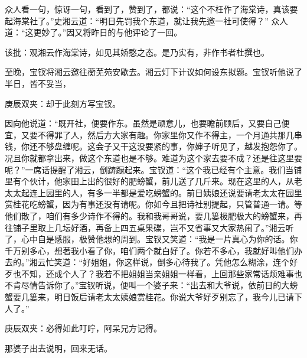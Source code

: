 \begin{parag}
    众人看一句，惊讶一句，看到了，赞到了，都说：“这个不枉作了海棠诗，真该要起海棠社了。”史湘云道：“明日先罚我个东道，就让我先邀一社可使得？” 众人道：“这更妙了。”因又将昨日的与他评论了一回。\begin{note}该批：观湘云作海棠诗，如见其娇憨之态。是乃实有，非作书者杜撰也。\end{note}
\end{parag}


\begin{parag}
    至晚，宝钗将湘云邀往蘅芜苑安歇去。湘云灯下计议如何设东拟题。宝钗听他说了半日，皆不妥当，\begin{note}庚辰双夹：却于此刻方写宝钗。\end{note}因向他说道：“既开社，便要作东。虽然是顽意儿，也要瞻前顾后，又要自己便宜，又要不得罪了人，然后方大家有趣。你家里你又作不得主，一个月通共那几串钱，你还不够盘缠呢。这会子又干这没要紧的事，你婶子听见了，越发抱怨你了。况且你就都拿出来，做这个东道也是不够。难道为这个家去要不成？还是往这里要呢？”一席话提醒了湘云，倒踌蹰起来。宝钗道：“这个我已经有个主意。我们当铺里有个伙计，他家田上出的很好的肥螃蟹，前儿送了几斤来。现在这里的人，从老太太起连上园里的人，有多一半都是爱吃螃蟹的。前日姨娘还说要请老太太在园里赏桂花吃螃蟹，因为有事还没有请呢。你如今且把诗社别提起，只管普通一请。等他们散了，咱们有多少诗作不得的。我和我哥哥说，要几篓极肥极大的螃蟹来，再往铺子里取上几坛好酒，再备上四五桌果碟，岂不又省事又大家热闹了。”湘云听了，心中自是感服，极赞他想的周到。宝钗又笑道：“我是一片真心为你的话。你千万别多心，想著我小看了你，咱们两个就白好了。你若不多心，我就好叫他们办去的。”湘云忙笑道：“好姐姐，你这样说，倒多心待我了。凭他怎么糊涂，连个好歹也不知，还成个人了？我若不把姐姐当亲姐姐一样看，上回那些家常话烦难事也不肯尽情告诉你了。”宝钗听说，便叫一个婆子来：“出去和大爷说，依前日的大螃蟹要几篓来，明日饭后请老太太姨娘赏桂花。你说大爷好歹别忘了，我今儿已请下人了。”\begin{note}庚辰双夹：必得如此叮咛，阿呆兄方记得。\end{note}那婆子出去说明，回来无话。
\end{parag}


